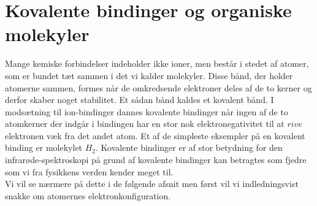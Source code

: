 \chapter{Kovalente bindinger og organiske molekyler}
Mange kemiske forbindelser indeholder ikke ioner, men består i stedet af atomer, som er bundet tæt sammen i det vi kalder molekyler. Disse bånd, der holder atomerne sammen, formes når de omkredsende elektroner deles af de to kerner og derfor skaber noget stabilitet. Et sådan bånd kaldes et kovalent bånd. I modsætning til ion-bindinger dannes kovalente bindinger når ingen af de to atomkerner der indgår i bindingen har en stor nok elektronegativitet til at $rive$ elektronen væk fra det andet atom. Et af de simpleste eksempler på en kovalent binding er molekylet $H_2$. Kovalente bindinger er af stor betydning for den infrarøde-spektroskopi på grund af kovalente bindinger kan betragtes som fjedre som vi fra fysikkens verden kender meget til.
\\
Vi vil se nærmere på dette i de følgende afsnit men først vil vi indledningsvist snakke om atomernes elektronkonfiguration. 

